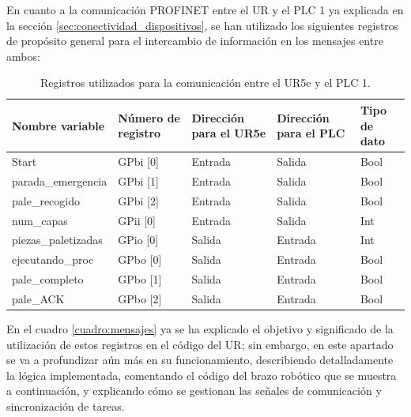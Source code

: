 En cuanto a la comunicación PROFINET entre el UR y el PLC 1 ya explicada en la sección \ref{sec:conectividad_dispositivos}, se han utilizado los siguientes registros de propósito general para el intercambio de información en los mensajes entre ambos:

\begin{table}[H]
\begin{center}

\renewcommand{\arraystretch}{1.5}
\begin{tabular}{|M{3.4cm}|M{2.3cm}|M{3cm}|M{2.5cm}|M{2cm}|}
\hline
\textbf{Nombre variable} &
\textbf{Número de registro} & 
\textbf{Direcci\'on para el UR5e} & 
\textbf{Direcci\'on para el PLC} &
\textbf{Tipo de dato} \\
\hline
Start  & GPbi [0] & Entrada & Salida & Bool \\
\hline
parada\_emergencia  & GPbi [1] & Entrada & Salida & Bool \\
\hline
pale\_recogido  & GPbi [2] & Entrada & Salida & Bool \\
\hline
num\_capas  & GPii [0] & Entrada & Salida & Int \\
\hline
piezas\_paletizadas  & GPio [0] & Salida & Entrada  & Int \\
\hline
ejecutando\_proc  & GPbo [0] & Salida & Entrada & Bool \\
\hline
pale\_completo  & GPbo [1] & Salida & Entrada & Bool \\
\hline
pale\_ACK  & GPbo [2] & Salida & Entrada & Bool \\
\hline

\end{tabular}

\caption{Registros utilizados para la comunicación entre el UR5e y el PLC 1.}
\label{cuadro:registros}
\end{center}
\end{table}

En el cuadro \ref{cuadro:mensajes} ya se ha explicado el objetivo y significado de la utilización de estos registros en el código del UR; sin embargo, en este apartado se va a profundizar aún más en su funcionamiento, describiendo detalladamente la lógica implementada, comentando el código del brazo robótico que se muestra a continuación, y explicando cómo se gestionan las señales de comunicación y sincronización de tareas.

